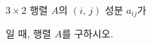 \hspace*{2mm}\begin{minipage}[t]{\dimexpr\linewidth-2mm\relax}\vspace{0pt}
$3\times 2$ 행렬 $A$의 $(i,\,j)$ 성분 $a_{ij}$가 \par\smallskip{}\par\smallskip\noindent 일 때, 행렬 $A$를 구하시오.\end{minipage}
